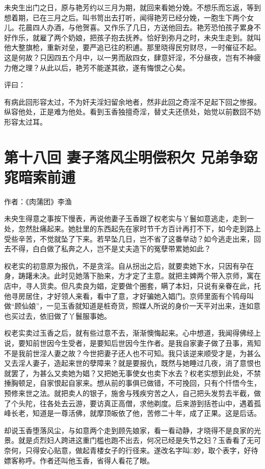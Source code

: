 \documentclass[a4paper,12pt,UTF8,twoside]{ctexbook}
\begin{document}
未央生出门之日，原与艳芳约以三月为期，就回来看她分娩。不想乐而忘返，等到想着期，已在三月之后。叫书笥出去打听，闻得艳芳已经分娩，一胞生下两个女儿。花晨四人办酒，与他贺喜。又作乐了几日，方送他回去。艳芳恐怕孩子累身不好作乐，就雇了两个奶娘，把孩子抱去抚养。恰好到弥月之时，未央生走到。就叫他大整旗枪，重新对垒，要严追已往的积逋。那里晓得民穷财尽，一时催征不起。这是何故？只因四五个月中，以一男而敌四女，肆意奸淫，不分昼夜，岂有不神疲力倦之理？从此以后，艳芳不能遂其欲，遂有悔恨之心矣。

评曰：

有病此回形容太过，不为奸夫淫妇留余地者，然非此回之奇淫不足起下回之惨报。纵容他处，正是难为他处。看到玉香独擅奇淫，替丈夫还债处，始觉以前数回不妨形容太过耳。

\chapter{第十八回 妻子落风尘明偿积欠 兄弟争窈窕暗索前逋}

作者：《肉蒲团》李渔

未央生得意之事按下慢表，再说他妻子玉香跟了权老实与丫鬟如意逃走，走到一处，忽然肚痛起来。她肚里的东西起先在家时节千方百计再打不下，如今走到路上受些辛苦，不觉就坠了下来。若早坠几日，岂不省了这番举动？如今逃走出来，回去不得，白白做了私奔之人，岂不是丈夫造下的冤孽带累她如此？

权老实的初意原为报仇，不是贪淫。自从拐出之后，就要卖她下水，只因有孕在身，踌躇未决。此时见她落下胎来，方才定了主意。就把主婢两个带入京师，寓在店中，寻人货卖。但凡卖良为娼，定要做个圈套，瞒了本妇，只说有亲眷在此，托他寻房居住，才好领人来看，看中了意，才好骗她入娼门。京师里面有个鸨母叫做“顾仙娘”，一见玉香就知道是桩奇货，照媒人所说的身价一天平对出来，连如意也买过去，依旧做了丫鬟服事她。

权老实卖过玉香之后，就有些过意不去，渐渐懊悔起来。心中想道，我闻得佛经上说，要知前世因今生受者，是要知后世因今生作者。是我自家妻子做了丑事，焉知不是我前世淫人妻之故？今世把妻子还人也不可知。我只该逆来顺受才是，为甚么又去淫人妻子，造起来世的孽障来？就是要报仇，既然与她睡过几夜，消了意恨也就罢了，为甚么又卖她为娼？又把她无事使女也卖下水去？权老实想到此处，不禁捶胸顿足，自家恨起自家来。想从前的事俱已做错，不可挽回，只有个忏悟今生，预修来世之法。就把卖人的银子，施舍与残疾穷苦之人，自己把头发剪去半截，做了个头陀，往各处去云游，要访真正高僧，求他剃度。后来游到括苍山中，遇着孤峰长老，知道是一尊活佛，就摩顶皈依了他，苦修二十年，成了正果。这是后话。

却说玉香堕落风尘，与如意两个走到顾先娘家，看一看动静，才晓得不是良家的光景。就是贞烈妇人跨进这重门槛也跑不出去，何况已经是失节之妇？玉香看了无可奈何，只得安心贴意，做起青楼女子的行径来。遂改名字叫□妙，取个表字，好待嫖客称呼。作者还叫他玉香，省得人看花了眼。
\end{document}
